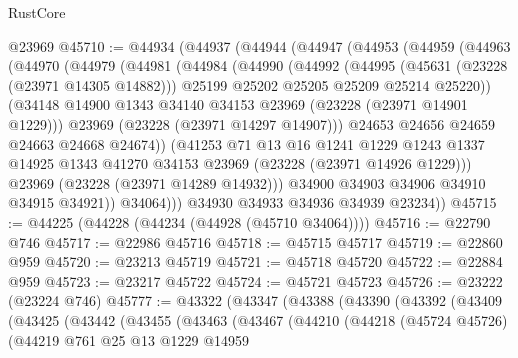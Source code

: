 \begin{lexlean}{RustCore}
\begin{coremodule}
    @23969
@45710 := @44934
    (@44937
      (@44944
        (@44947
          (@44953
            (@44959
              (@44963
                (@44970
                  (@44979
                    (@44981
                      (@44984
                        (@44990
                          (@44992
                            (@44995
                              (@45631 (@23228 (@23971 @14305 @14882)))
                              @25199
                              @25202
                              @25205
                              @25209
                              @25214
                              @25220))
                          (@34148 @14900 @1343 @34140 @34153 @23969 (@23228 (@23971 @14901 @1229)))
                          @23969
                          (@23228 (@23971 @14297 @14907)))
                        @24653
                        @24656
                        @24659
                        @24663
                        @24668
                        @24674))
                    (@41253
                      @71
                      @13
                      @16
                      @1241
                      @1229
                      @1243
                      @1337
                      @14925
                      @1343
                      @41270
                      @34153
                      @23969
                      (@23228 (@23971 @14926 @1229)))
                    @23969
                    (@23228 (@23971 @14289 @14932)))
                  @34900
                  @34903
                  @34906
                  @34910
                  @34915
                  @34921))
              @34064)))
        @34930
        @34933
        @34936
        @34939
        @23234))
@45715 := @44225 (@44228 (@44234 (@44928 (@45710 @34064))))
@45716 := @22790 @746
@45717 := @22986 @45716
@45718 := @45715 @45717
@45719 := @22860 @959
@45720 := @23213 @45719
@45721 := @45718 @45720
@45722 := @22884 @959
@45723 := @23217 @45722
@45724 := @45721 @45723
@45726 := @23222 (@23224 @746)
@45777 := @43322
    (@43347
      (@43388
        (@43390
          (@43392
            (@43409
              (@43425
                (@43442
                  (@43455
                    (@43463
                      (@43467
                        (@44210
                          (@44218
                            (@45724 @45726)
                            (@44219
                              @761
                              @25
                              @13
                              @1229
                              @14959

\end{coremodule}
\end{lexlean}
